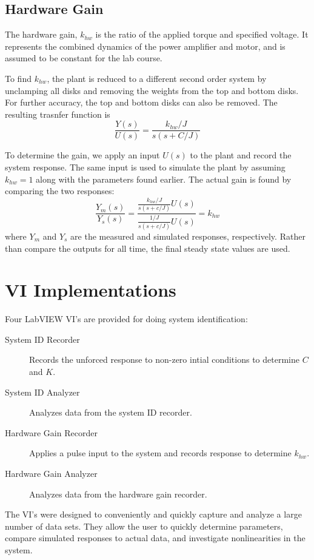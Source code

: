 \subsection{Hardware Gain}
The hardware gain, $k_{hw}$ is the ratio of the applied torque and specified
voltage.  It represents the combined dynamics of the power amplifier
and motor, and is assumed to be constant for the lab course.

To find $k_{hw}$, the plant is reduced to a different second order
system by unclamping all disks and removing the weights from the top
and bottom disks.  For further accuracy, the top and bottom disks can
also be removed.  The resulting trasnfer function is 
\[ \frac{Y(s)}{U(s)} = \frac{k_{hw}/J}{s(s + C/J)} \]

To determine the gain, we apply an input $U(s)$ to the plant and
record the system response.  The same input is used to simulate the
plant by assuming $k_{hw}=1$ along with the parameters found earlier.
The actual gain is found by comparing the two responses:
\[ \frac{Y_m(s)}{Y_s(s)} = \frac{\frac{k_{hw}/J}{s(s + c/J)}U(s)}{\frac{1/J}{s(s + c/J)}U(s)} = k_{hw} \]
where $Y_m$ and $Y_s$ are the measured and simulated responses,
respectively.  Rather than compare the outputs for all time, the final
steady state values are used.

\section{VI Implementations}

Four LabVIEW VI's are provided for doing system identification:
\begin{description}
	\item[System ID Recorder] Records the unforced response to
	non-zero intial conditions to determine $C$ and $K$.
	\item[System ID Analyzer] Analyzes data from the system ID recorder.
	\item[Hardware Gain Recorder] Applies a pulse input to the
	system and records response to determine $k_{hw}$.
	\item[Hardware Gain Analyzer] Analyzes data from the hardware gain recorder.
\end{description}
	
The VI's were designed to conveniently and quickly capture and analyze
a large number of data sets.  They allow the user to quickly determine
parameters, compare simulated responses to actual data, and
investigate nonlinearities in the system.

